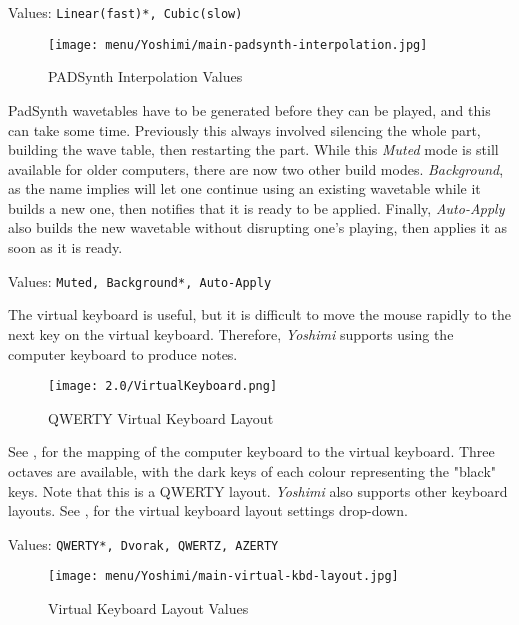    Values: \texttt{Linear(fast)*, Cubic(slow)}

\begin{figure}[H]
   \centering
   \texttt{[image: menu/Yoshimi/main-padsynth-interpolation.jpg]}
   \caption[PADSynth Interpolation]{PADSynth Interpolation Values}
   \label{fig:padsynth_interpolation}
\end{figure}


   PadSynth wavetables have to be generated before they can be played, and this can take
   some time. Previously this always involved silencing the whole part, building the
   wave table, then restarting the part. While this \textsl{Muted} mode is still
   available for older computers, there are now two other build modes.
   \textsl{Background}, as the name implies will let one continue using an existing
   wavetable while it builds a new one, then notifies that it is ready to be applied.
   Finally, \textsl{Auto-Apply} also builds the new wavetable without disrupting one's
   playing, then applies it as soon as it is ready.

   Values: \texttt{Muted, Background*, Auto-Apply}

   The virtual keyboard is useful, but it is difficult to move the mouse
   rapidly to the next key on the virtual keyboard.
   Therefore, \textsl{Yoshimi} supports using the computer keyboard
   to produce notes.

\begin{figure}[H]
   \centering
   \texttt{[image: 2.0/VirtualKeyboard.png]}
   \caption{QWERTY Virtual Keyboard Layout}
   \label{fig:qwerty_virtual_keyboard}
\end{figure}

   See , for the mapping of the computer keyboard to
   the virtual keyboard. Three octaves are available, with the dark keys of each colour
   representing the "black" keys.
   Note that this is a QWERTY layout.
   \textsl{Yoshimi} also supports other keyboard layouts.
   See ,
   for the virtual keyboard layout settings drop-down.

   Values: \texttt{QWERTY*, Dvorak, QWERTZ, AZERTY}

\begin{figure}[H]
   \centering
   \texttt{[image: menu/Yoshimi/main-virtual-kbd-layout.jpg]}
   \caption[Virtual Keyboard Layout]{Virtual Keyboard Layout Values}
   \label{fig:virtual_kbd_layout}
\end{figure}

